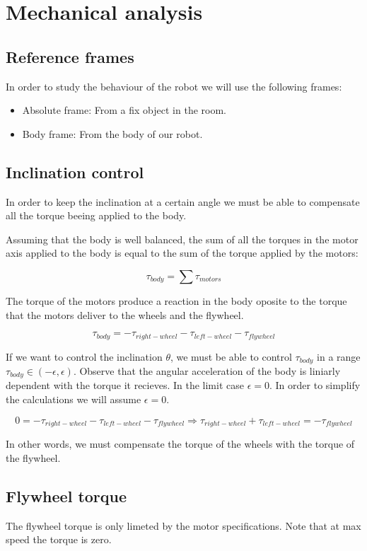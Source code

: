 \section{Mechanical analysis}
\subsection{Reference frames}
In order to study the behaviour of the robot we will use the following frames:
\begin{itemize}
    \item Absolute frame: From a fix object in the room. 
    \item Body frame: From the body of our robot.
\end{itemize}
\subsection{Inclination control}
In order to keep the inclination at a certain angle we must be able to compensate all the torque beeing applied to the body.

Assuming that the body is well balanced, the sum of all the torques in the motor axis applied to the body is equal to the sum of the torque applied by the motors:

\[\tau_{body} = \sum \tau_{motors}\]

The torque of the motors produce a reaction in the body oposite to the torque that the motors deliver to the wheels and the flywheel.

\[\tau_{body} = -\tau_{right-wheel} -\tau_{left-wheel} -\tau_{flywheel} \]

If we want to control the inclination $\theta$, we must be able to control $\tau_{body}$ in a range $\tau_{body} \in (-\epsilon, \epsilon)$. Observe that the angular acceleration of the body is liniarly dependent with the torque it recieves. In the limit case $\epsilon = 0$. In order to simplify the calculations we will assume $\epsilon = 0$.

\[0 = -\tau_{right-wheel} -\tau_{left-wheel} -\tau_{flywheel} \Rightarrow \tau_{right-wheel} +\tau_{left-wheel} = -\tau_{flywheel} \]

In other words, we must compensate the torque of the wheels with the torque of the flywheel.

\subsection{Flywheel torque}
The flywheel torque is only limeted by the motor specifications. Note that at max speed the torque is zero.


